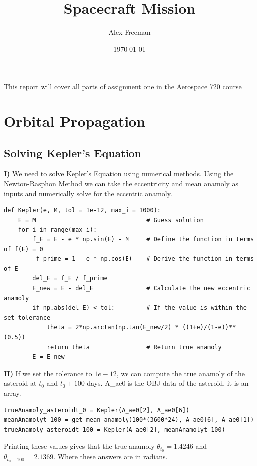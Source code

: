 \documentclass[12pt,twocolumn]{article}  %
\title{Spacecraft Mission}
\author{Alex Freeman}
\date{\today}
\begin{document}
\maketitle


This report will cover all parts of assignment one in the Aerospace 720 course

\section{Orbital Propagation}

\subsection{Solving Kepler's Equation}

\textbf{I)} We need to solve Kepler's Equation using numerical methods. Using the Newton-Rasphon Method we can take the eccentricity and mean anamoly as 
inputs and numerically solve for the eccentric anamoly. 

\begin{lstlisting}
def Kepler(e, M, tol = 1e-12, max_i = 1000):
    E = M                               # Guess solution
    for i in range(max_i):
        f_E = E - e * np.sin(E) - M     # Define the function in terms of f(E) = 0
         f_prime = 1 - e * np.cos(E)    # Derive the function in terms of E
        del_E = f_E / f_prime           
        E_new = E - del_E               # Calculate the new eccentric anamoly
        if np.abs(del_E) < tol:         # If the value is within the set tolerance 
            theta = 2*np.arctan(np.tan(E_new/2) * ((1+e)/(1-e))**(0.5))
            return theta                # Return true anamoly
        E = E_new
\end{lstlisting}
\vspace{0.5cm}
\noindent \textbf{II)} If we set the tolerance to $1e-12$, we can compute the true anamoly of the asteroid 
at $t_0$ and $t_0 + 100$ days. A\_ae0 is the OBJ data of the asteroid, it is an array.
\begin{lstlisting}
trueAnamoly_asteroidt_0 = Kepler(A_ae0[2], A_ae0[6])  
meanAnamolyt_100 = get_mean_anamoly(100*(3600*24), A_ae0[6], A_ae0[1])
trueAnamoly_asteroidt_100 = Kepler(A_ae0[2], meanAnamolyt_100)
\end{lstlisting}
Printing these values gives that the true anamoly $\theta_{t_0} = 1.4246$ and $\theta_{t_0 + 100} = 2.1369$. 
Where these answers are in radians.
\end{document}
